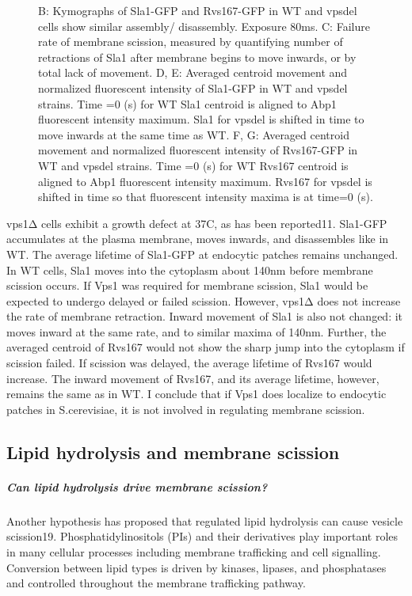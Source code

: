 \begin{figure}
{		B: Kymographs of Sla1-GFP and Rvs167-GFP in WT and vpsdel cells show similar assembly/ disassembly. Exposure 80ms.  
		C: Failure rate of membrane scission, measured by quantifying number of retractions of Sla1 after membrane begins to move inwards, or by total lack of movement. 
		D, E: Averaged centroid movement and normalized fluorescent intensity of Sla1-GFP in WT and vpsdel strains. Time =0 (s) for WT Sla1 centroid is aligned to Abp1 fluorescent intensity maximum. Sla1 for vpsdel is shifted in time to move inwards at the same time as WT. 
		F, G: Averaged centroid movement and normalized fluorescent intensity of Rvs167-GFP in WT and vpsdel strains. Time =0 (s) for WT Rvs167 centroid is aligned to Abp1 fluorescent intensity maximum. Rvs167 for vpsdel is shifted in time so that fluorescent intensity maxima is at time=0 (s).
		\label{fig3_vpsdel}}
	\end{figure}

	
	\vspace{5mm}
	vps1Δ cells exhibit a growth defect at 37C, as has been reported11. Sla1-GFP accumulates at the plasma membrane, moves inwards, and disassembles like in WT. The average lifetime of Sla1-GFP at endocytic patches remains unchanged. In WT cells, Sla1 moves into the cytoplasm about 140nm before membrane scission occurs. If Vps1 was required for membrane scission, Sla1 would be expected to undergo delayed or failed scission. However, vps1Δ does not increase the rate of membrane retraction. Inward movement of Sla1 is also not changed: it moves inward at the same rate, and to similar maxima of 140nm. Further, the averaged centroid of Rvs167 would not show the sharp jump into the cytoplasm if scission failed. If scission was delayed, the average lifetime of Rvs167 would increase. The inward movement of Rvs167, and its average lifetime, however, remains the same as in WT. I conclude that if Vps1 does localize to endocytic patches in S.cerevisiae, it is not involved in regulating membrane scission.  


	\subsection{Lipid hydrolysis and membrane scission}
	
	\subparagraph{Can lipid hydrolysis drive membrane scission?}
	Another hypothesis has proposed that regulated lipid hydrolysis can cause vesicle scission19. Phosphatidylinositols (PIs) and their derivatives play important roles in many cellular processes including membrane trafficking and cell signalling. Conversion between lipid types is driven by kinases, lipases, and phosphatases and controlled throughout the membrane trafficking pathway. 
	
